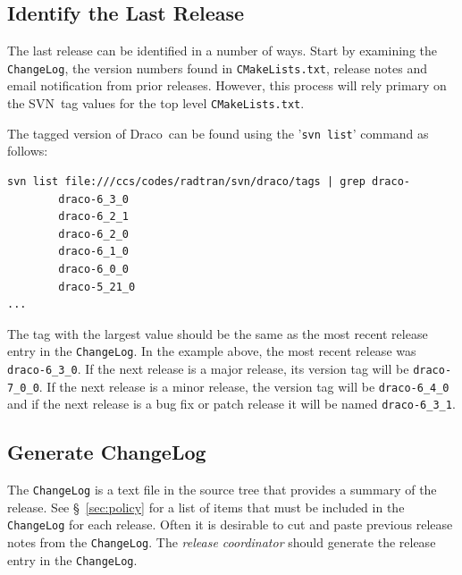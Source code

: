 \documentclass[note]{ResearchNote_pdf}
\newcommand{\draco}{{\normalfont\small\sffamily Draco}}
\newcommand{\svn}{\textsf{SVN}}
\begin{document}

\subsection{Identify the Last Release}
\label{sec:last_rel}

The last release can be identified in a number of ways.  Start by
examining the \texttt{ChangeLog}, the version numbers found in
\texttt{CMakeLists.txt}, release notes and email notification from
prior releases.  However, this process will rely primary on the
\svn\ tag values for the top level \texttt{CMakeLists.txt}.

The tagged version of \draco\ can be found using the '\texttt{svn list}' command as follows:
%
\begin{lstlisting}[basicstyle=\footnotesize, xleftmargin=1.0in, 
  xrightmargin=1.0in]
svn list file:///ccs/codes/radtran/svn/draco/tags | grep draco-
        draco-6_3_0
        draco-6_2_1
        draco-6_2_0
        draco-6_1_0
        draco-6_0_0
        draco-5_21_0
...
\end{lstlisting}
%
The tag with the largest value should be the same as the most recent release entry in the \texttt{ChangeLog}.
In the example above, the most recent release was \texttt{draco-6\_3\_0}.  If the
next release is a major release, its version tag will be
\texttt{draco-7\_0\_0}.  If the next release is a minor release, the
version tag will be \texttt{draco-6\_4\_0} and if the next release is
a bug fix or patch release it will be named \texttt{draco-6\_3\_1}.


\subsection{Generate ChangeLog}
\label{sec:changelog}

The \texttt{ChangeLog} is a text file in the source tree that provides
a summary of the release.  See \S~\ref{sec:policy} for a list of items
that must be included in the \texttt{ChangeLog} for each release.
Often it is desirable to cut and paste previous release notes from
the \texttt{ChangeLog}.  The {\it release coordinator} should generate
the release entry in the \texttt{ChangeLog}.
\end{document}
